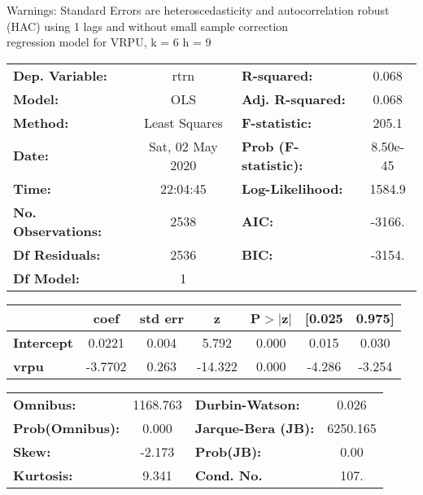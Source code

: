 Warnings: \newline
 [1] Standard Errors are heteroscedasticity and autocorrelation robust (HAC) using 1 lags and without small sample correction\\ 

regression model for VRPU, k = 6 h = 9\begin{center}
\begin{tabular}{lclc}
\toprule
\textbf{Dep. Variable:}    &       rtrn       & \textbf{  R-squared:         } &     0.068   \\
\textbf{Model:}            &       OLS        & \textbf{  Adj. R-squared:    } &     0.068   \\
\textbf{Method:}           &  Least Squares   & \textbf{  F-statistic:       } &     205.1   \\
\textbf{Date:}             & Sat, 02 May 2020 & \textbf{  Prob (F-statistic):} &  8.50e-45   \\
\textbf{Time:}             &     22:04:45     & \textbf{  Log-Likelihood:    } &    1584.9   \\
\textbf{No. Observations:} &        2538      & \textbf{  AIC:               } &    -3166.   \\
\textbf{Df Residuals:}     &        2536      & \textbf{  BIC:               } &    -3154.   \\
\textbf{Df Model:}         &           1      & \textbf{                     } &             \\
\bottomrule
\end{tabular}
\begin{tabular}{lcccccc}
                   & \textbf{coef} & \textbf{std err} & \textbf{z} & \textbf{P$> |$z$|$} & \textbf{[0.025} & \textbf{0.975]}  \\
\midrule
\textbf{Intercept} &       0.0221  &        0.004     &     5.792  &         0.000        &        0.015    &        0.030     \\
\textbf{vrpu}      &      -3.7702  &        0.263     &   -14.322  &         0.000        &       -4.286    &       -3.254     \\
\bottomrule
\end{tabular}
\begin{tabular}{lclc}
\textbf{Omnibus:}       & 1168.763 & \textbf{  Durbin-Watson:     } &    0.026  \\
\textbf{Prob(Omnibus):} &   0.000  & \textbf{  Jarque-Bera (JB):  } & 6250.165  \\
\textbf{Skew:}          &  -2.173  & \textbf{  Prob(JB):          } &     0.00  \\
\textbf{Kurtosis:}      &   9.341  & \textbf{  Cond. No.          } &     107.  \\
\bottomrule
\end{tabular}
\end{center}

